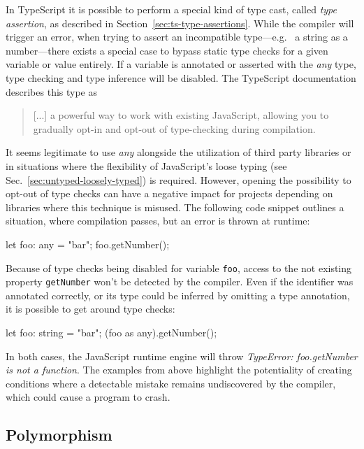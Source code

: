 In TypeScript it is possible to perform a special kind of type cast, called \emph{type assertion}, as described in Section~\ref{sec:ts-type-assertions}. While the compiler will trigger an error, when trying to assert an incompatible type---e.g.\  a string as a number---there exists a special case to bypass static type checks for a given variable or value entirely. If a variable is annotated or asserted with the \emph{any} type, type checking and type inference will be disabled. The TypeScript documentation describes this type as 
\begin{quote}
   [...] a powerful way to work with existing JavaScript, allowing you to gradually opt-in and opt-out of type-checking during compilation.~\cite{TypeScriptHandbook:BasicTypes}
\end{quote}
It seems legitimate to use \emph{any} alongside the utilization of third party libraries or in situations where the flexibility of JavaScript's loose typing (see Sec.~\ref{sec:untyped-loosely-typed}) is required. However, opening the possibility to opt-out of type checks can have a negative impact for projects depending on libraries where this technique is misused. The following code snippet outlines a situation, where compilation passes, but an error is thrown at runtime:
\begin{JsCode}[numbers=none]
let foo: any = "bar";
foo.getNumber();
\end{JsCode}
Because of type checks being disabled for variable \texttt{foo}, access to the not existing property \texttt{getNumber} won't be detected by the compiler. Even if the identifier was annotated correctly, or its type could be inferred by omitting a type annotation, it is possible to get around type checks:
\begin{JsCode}[numbers=none]
let foo: string = "bar";
(foo as any).getNumber();
\end{JsCode}
In both cases, the JavaScript runtime engine will throw \emph{TypeError: foo.getNumber is not a function}. The examples from above highlight the potentiality of creating conditions where a detectable mistake remains undiscovered by the compiler, which could cause a program to crash.

\subsection{Polymorphism}

